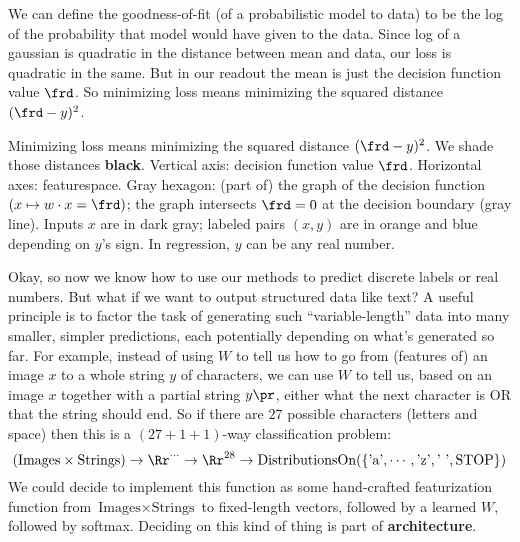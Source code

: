   We can define the goodness-of-fit (of a probabilistic model to data) to be
  the log of the probability that model would have given to the data.  Since
  log of a gaussian is quadratic in the distance between mean and data, our
  loss is quadratic in the same.  But in our readout the mean is just the
  decision function value $\frd$.  So minimizing loss means minimizing the
  squared distance $(\frd-y)^2$.
  \begin{marginfigure}[-4cm]
    \caption{
      Minimizing loss means
          minimizing the squared distance $(\frd-y)^2$.
      We shade those distances \textbf{black}.
      Vertical axis: decision function value $\frd$.
      Horizontal axes: featurespace.
      {\gre Gray hexagon}: (part of) the graph of the decision function
        $(x\mapsto w\cdot x=\frd)$; the graph intersects $\frd=0$ at the
        decision boundary ({\gre gray line}).
      Inputs $x$ are in {\dgre dark gray}; labeled pairs $(x, y)$ are in
      {\rng orange} and {\blu blue} depending on $y$'s sign.  In regression,
      $y$ can be any real number.
    }
  \end{marginfigure}




  \newpage
{}\marginnote{\veryoptional}%
  Okay, so now we know how to use our methods to predict discrete labels or
  real numbers.  But what if we want to output structured data like text?  A
  useful principle is to factor the task of generating such ``variable-length''
  data into many smaller, simpler predictions, each potentially depending on
  what's generated so far.  For example, instead of using $W$ to tell us how to
  go from (features of) an image $x$ to a whole string $y$ of characters, we
  can use $W$ to tell us, based on an image $x$ together with a partial string
  $y\pr$, either what the next character is OR that the string should end.  So
  if there are $27$ possible characters (letters and space) then this is a
  $(27+1+1)$-way classification problem:
  $$
    (\text{Images} \times \text{Strings}) \to
    \Rr^{\cdots} \to
    \Rr^{28} \to
    \text{DistributionsOn}(\{\text{'a'}, \cdots, \text{'z'}, \text{' '}, \text{STOP}\})
  $$
  We could decide to implement this function as some hand-crafted featurization
  function from $\text{Images} \times \text{Strings}$ to fixed-length vectors,
  followed by a learned $W$, followed by softmax.  Deciding on this kind of
  thing is part of \textbf{architecture}.

